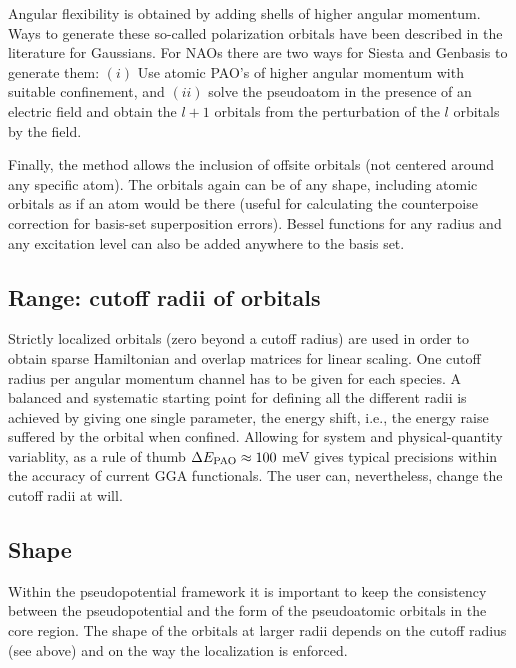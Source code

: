 \documentclass[11pt]{article}
\begin{document}
  Angular flexibility is obtained by adding shells of higher angular 
momentum.
  Ways to generate these so-called polarization orbitals have been
described in the literature for Gaussians. 
  For NAOs there are two ways for {\sc Siesta} and {\sc Genbasis} to
generate them: $(i)$ Use atomic PAO's of higher angular momentum with
suitable confinement, and $(ii)$ solve the pseudoatom in the presence
of an electric field and obtain the $l+1$ orbitals from the perturbation
of the $l$ orbitals by the field.

  Finally, the method allows the inclusion of offsite orbitals (not centered
around any specific atom). The orbitals again can be of any shape, including
atomic orbitals as if an atom would be there (useful for calculating the
counterpoise correction for basis-set superposition errors). 
Bessel functions for any radius and any excitation level can also be 
added anywhere to the basis set.

\subsection{Range: cutoff radii of orbitals}

  Strictly localized orbitals (zero beyond a cutoff radius) are used
in order to obtain sparse Hamiltonian and overlap matrices for linear 
scaling. One cutoff radius per angular momentum channel has to be
given for each species. 
  A balanced and systematic starting point for defining all the different 
radii is achieved by giving one single parameter, the energy shift, i.e., 
the energy raise suffered by the orbital when confined.
Allowing for system and physical-quantity variablity, as a rule of thumb
$\Delta E_{\small \rm PAO} \approx 100$ meV gives 
typical precisions within the accuracy of current GGA functionals.
The user can, nevertheless, change the cutoff radii at will.

\subsection{Shape}

  Within the pseudopotential framework it is important to keep 
the consistency between the pseudopotential and
the form of the pseudoatomic orbitals in the core region.
  The shape of the orbitals at larger radii depends on the
cutoff radius (see above) and on the way the localization 
is enforced.
\end{document}
